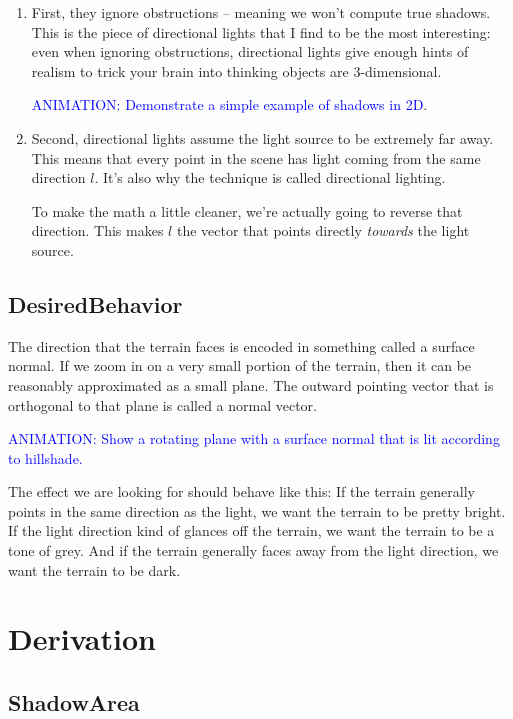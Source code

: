 \documentclass{article}
\newcommand\animation[1]{\textcolor{blue}{ANIMATION: #1}}
\begin{document}
\begin{enumerate}

\item First, they ignore obstructions -- meaning we won't compute true shadows.
This is the piece of directional lights that I find to be the most interesting: even when ignoring obstructions, directional lights give enough hints of realism to trick your brain into thinking objects are 3-dimensional.

\animation{Demonstrate a simple example of shadows in 2D}.
	
\item Second, directional lights assume the light source to be extremely far away.
This means that every point in the scene has light coming from the same direction $l$.
It's also why the technique is called directional lighting.

To make the math a little cleaner, we're actually going to reverse that direction.
This makes $l$ the vector that points directly \textit{towards} the light source.

\end{enumerate}

\subsection{DesiredBehavior}

The direction that the terrain faces is encoded in something called a surface normal.
If we zoom in on a very small portion of the terrain, then it can be reasonably approximated as a small plane.
The outward pointing vector that is orthogonal to that plane is called a normal vector.

\animation{Show a rotating plane with a surface normal that is lit according to hillshade.}

The effect we are looking for should behave like this:
If the terrain generally points in the same direction as the light, we want the terrain to be pretty bright.
If the light direction kind of glances off the terrain, we want the terrain to be a tone of grey.
And if the terrain generally faces away from the light direction, we want the terrain to be dark.

\section{Derivation}

\subsection{ShadowArea}
\end{document}
